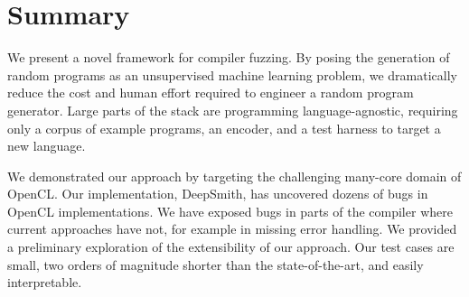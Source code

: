 \section{Summary}
\label{sec:deepsmith-conclusion}

We present a novel framework for compiler fuzzing. By posing the generation of
random programs as an unsupervised machine learning problem, we dramatically
reduce the cost and human effort required to engineer a random program
generator. Large parts of the stack are programming language-agnostic, requiring
only a corpus of example programs, an encoder, and a test harness to target a
new language.

We demonstrated our approach by targeting the challenging many-core domain of
OpenCL. Our implementation, DeepSmith, has uncovered dozens of bugs in OpenCL
implementations. We have exposed bugs in parts of the compiler where current
approaches have not, for example in missing error handling. We provided a
preliminary exploration of the extensibility of our approach. Our test cases are
small, two orders of magnitude shorter than the state-of-the-art, and easily
interpretable.
